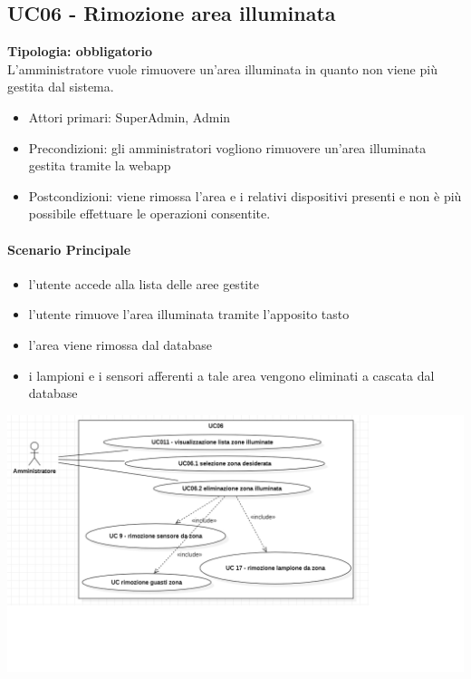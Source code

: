 \documentclass[12pt]{article}
\begin{document}
\subsection{UC06 - Rimozione area illuminata}
\textbf{Tipologia: obbligatorio} \\
L'amministratore vuole rimuovere un'area illuminata in quanto non viene più gestita dal sistema.
\begin{itemize}
	\item Attori primari: SuperAdmin, Admin
	\item Precondizioni: gli amministratori vogliono rimuovere un'area illuminata gestita tramite la webapp
	\item Postcondizioni: viene rimossa l'area e i relativi dispositivi presenti e non è più possibile effettuare le operazioni consentite.
\end{itemize}
\paragraph{Scenario Principale}
\begin{itemize}
	\item l'utente accede alla lista delle aree gestite
	\item l'utente rimuove l'area illuminata tramite l'apposito tasto
	\item l'area viene rimossa dal database 
	\item i lampioni e i sensori afferenti a tale area vengono eliminati a cascata dal database
\end{itemize}

\includegraphics[scale=0.5]{UC06.png}
\end{document}
